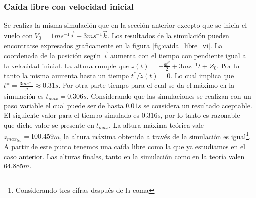 \documentclass[main]{subfiles}
\begin{document}
\subsubsection{Ca\'ida libre con velocidad inicial}
Se realiza la misma simulaci\'on que en la secci\'on anterior excepto que se inicia el vuelo con $V_0 = 1ms^{-1}\vec{i}+3ms^{-1}\vec{k}$. Los resultados de la simulaci\'on pueden encontrarse expresados graficamente en la figura \ref{fig:caida_libre_vi}. La coordenada de la posici\'on seg\'un $\vec{i}$ aumenta con el tiempo con pendiente igual a la velocidad inicial. La altura cumple que $z(t)=-\frac{gt^2}{2}+3ms^{-1}t+Z_0$. Por lo tanto la misma aumenta hasta un tiempo  $t^* / \dot{z}(t)=0$. Lo cual implica que $t*=\frac{3ms^{-1}}{g}\approx0.31s$. Por otra parte tiempo para el cual se da el m\'aximo en la simulaci\'on es $t_{max} = 0.306s$. Considerando que las simulaciones se realizan con un paso variable el cual puede ser de hasta $0.01s$ se considera un resultado aceptable. El siguiente valor para el tiempo simulado es $0.316s$, por lo tanto es razonable que dicho valor se presente en $t_{max}$. La altura m\'axima te\'orica vale $z_{max_{teo}}=100.459m$, la altura m\'axima obtenida a trav\'es de la simulaci\'on es igual\footnote{Considerando tres cifras despu\'es de la coma}. A partir de este punto tenemos una ca\'ida libre como la que ya estudiamos en el caso anterior. Las alturas finales, tanto en la simulaci\'on como en la teor\'ia valen $64.885m$.
\end{document}
